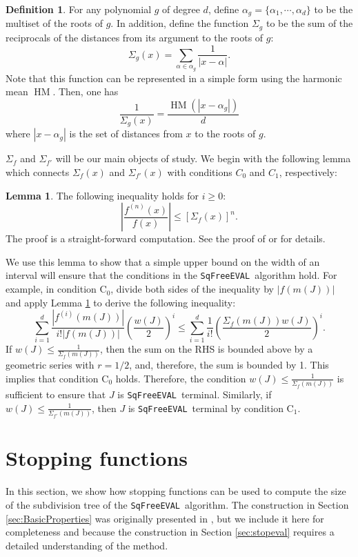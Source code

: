 \documentclass{amsart}
\theoremstyle{definition}
\newtheorem{definition}{Definition}[section]
\newtheorem{lemma}{Lemma}[section]
\newcommand{\EVAL}{\texttt{SqFreeEVAL}}
\DeclareMathOperator{\HM}{HM}
\begin{document}
\begin{definition}
For any polynomial $g$ of degree $d$, define $\alpha_g=\{\alpha_1,\cdots,\alpha_d\}$ to be the multiset of the roots of $g$. In addition, define the function $\Sigma_g$ to be the sum of the reciprocals of the distances from its argument to the roots of $g$:
$$\Sigma_g(x)=\sum_{\alpha\in \alpha_g}\frac{1}{|x-\alpha|}.$$
Note that this function can be represented in a simple form using the harmonic mean $\HM$.  Then, one has
$$\frac{1}{\Sigma_g(x)}=\frac{\HM(|x-\alpha_g|)}{d}$$
where $|x-\alpha_g|$ is the set of distances from $x$ to the roots of $g$.
\end{definition}
$\Sigma_f$ and $\Sigma_{f'}$ will be our main objects of study.  We begin with the following lemma which connects $\Sigma_f(x)$ and $\Sigma_{f'}(x)$ with conditions $C_0$ and $C_1$, respectively:
\begin{lemma}\label{lem:Sigma}
The following inequality holds for $i\geq 0$:
$$\left|\frac{f^{(n)}(x)}{f(x)}\right|\leq\left[\Sigma_f(x)\right]^n.$$
The proof is a straight-forward computation.  See the proof of \citep[Lemma 6.2]{Burr-Krahmer-Yap:integral:09} or \citep[Section 5.2]{sagraloff-yap:ceval:09} for details.
\end{lemma}

We use this lemma to show that a simple upper bound on the width of an interval will ensure that the conditions in the \EVAL\ algorithm hold. For example, in condition $\text{C}_0$, divide both sides of the inequality by $|f(m(J))|$ and apply Lemma \ref{lem:Sigma} to derive the following inequality:
$$\sum_{i=1}^d\frac{|f^{(i)}(m(J))|}{i!|f(m(J))|}\left(\frac{w(J)}{2}\right)^i\leq\sum_{i=1}^d\frac{1}{i!}\left(\frac{\Sigma_f(m(J))w(J)}{2}\right)^i.$$
If $w(J)\leq\frac{1}{\Sigma_f(m(J))}$, then the sum on the RHS is bounded above by a geometric series with $r=1/2$, and, therefore, the sum is bounded by 1.  This implies that condition $\text{C}_0$ holds.  Therefore, the condition $w(J)\leq\frac{1}{\Sigma_f(m(J))}$ is sufficient to ensure that $J$ is \EVAL\ terminal.  Similarly, if $w(J)\leq\frac{1}{\Sigma_{f'}(m(J))}$, then $J$ is \EVAL\ terminal by condition $\text{C}_1$.

\section{Stopping functions}\label{Sec:Integral}
In this section, we show how stopping functions can be used to compute the size of the subdivision tree of the \EVAL\ algorithm.  The construction in Section \ref{sec:BasicProperties} was originally presented in \citep{Burr-Krahmer-Yap:integral:09}, but we include it here for completeness and because the construction in Section \ref{sec:stopeval} requires a detailed understanding of the method.
\end{document}
